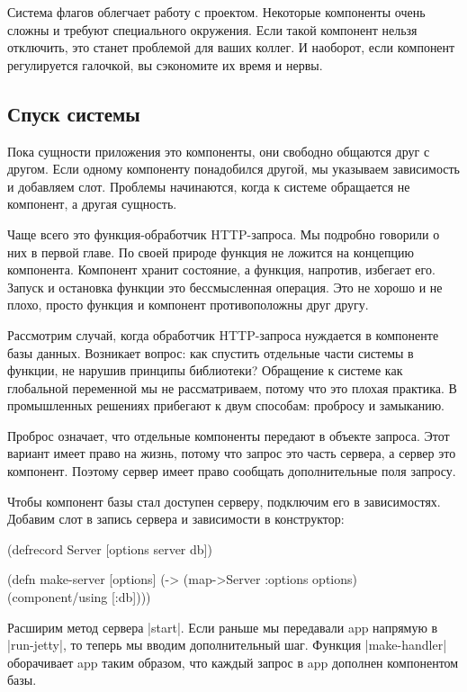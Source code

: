 Система флагов облегчает работу с проектом. Некоторые компоненты очень сложны и
требуют специального окружения. Если такой компонент нельзя отключить, это
станет проблемой для ваших коллег. И наоборот, если компонент регулируется
галочкой, вы сэкономите их время и нервы.

\subsection{Спуск системы}

Пока сущности приложения это компоненты, они свободно общаются друг с
другом. Если одному компоненту понадобился другой, мы указываем зависимость и
добавляем слот. Проблемы начинаются, когда к системе обращается не компонент, а
другая сущность.

Чаще всего это функция-обработчик HTTP-запроса. Мы подробно говорили о них в
первой главе. По своей природе функция не ложится на концепцию
компонента. Компонент хранит состояние, а функция, напротив, избегает
его. Запуск и остановка функции это бессмысленная операция. Это не хорошо и не
плохо, просто функция и компонент противоположны друг другу.

Рассмотрим случай, когда обработчик HTTP-запроса нуждается в компоненте базы
данных. Возникает вопрос: как спустить отдельные части системы в функции, не
нарушив принципы библиотеки? Обращение к системе как глобальной переменной мы не
рассматриваем, потому что это плохая практика. В промышленных решениях прибегают
к двум способам: пробросу и замыканию.

Проброс означает, что отдельные компоненты передают в объекте запроса. Этот
вариант имеет право на жизнь, потому что запрос это часть сервера, а сервер это
компонент. Поэтому сервер имеет право сообщать дополнительные поля запросу.

Чтобы компонент базы стал доступен серверу, подключим его в
зависимостях. Добавим слот в запись сервера и зависимости в конструктор:

\begin{code}
(defrecord Server
    [options server db])

(defn make-server
  [options]
  (-> (map->Server {:options options})
      (component/using [:db])))
\end{code}

Расширим метод сервера \spverb|start|. Если раньше мы передавали app напрямую в
\spverb|run-jetty|, то теперь мы вводим дополнительный шаг. Функция \spverb|make-handler|
оборачивает app таким образом, что каждый запрос в app дополнен компонентом
базы.

